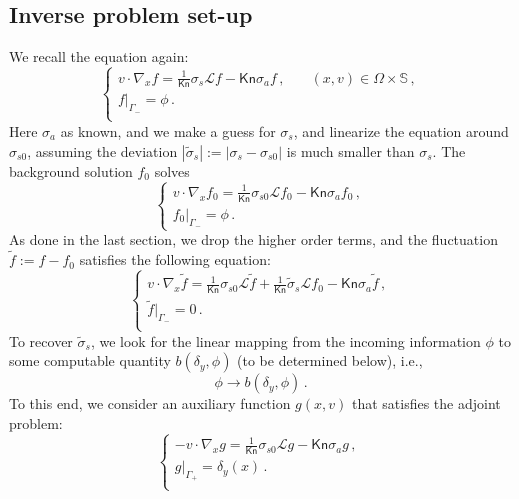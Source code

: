 \documentclass[english,reqno]{amsart}
\theoremstyle{plain}
\theoremstyle{definition} %
\newcommand{\opL}{\mathcal{L}}
\newcommand{\Kn}{\mathsf{Kn}}
\begin{document}
\subsection{Inverse problem set-up}\label{sec:sigma_s_set_up}
We recall the equation again:
\begin{equation}\label{eqn:RTE_sca}
\begin{cases}
v\cdot \nabla_x f =  \frac{1}{\Kn}\sigma_s \mathcal{L} f - \Kn \sigma_a f \,,\quad &(x,v)\in\Omega\times\mathbb{S}\,,\\
 f |_{\Gamma_-}=\phi\,. &  \\
\end{cases}
\end{equation}
Here $\sigma_a$ as known, and we make a guess for $\sigma_s$, and linearize the equation around $\sigma_{s0}$, assuming the deviation $|\tilde{\sigma}_s|:=|\sigma_s-\sigma_{s0}|$ is much smaller than $\sigma_s$. The background solution $f_0$ solves
\begin{equation}\label{eqn:RTE_sca_0}
\begin{cases}
v \cdot \nabla_x f_0 = \frac{1}{\Kn} \sigma_{s0} \opL f_0 -\Kn \sigma_a f_0 \,,
\\ f_0 |_{\Gamma_-} = \phi\,.
\end{cases}
\end{equation}
As done in the last section, we drop the higher order terms, and the fluctuation $\tilde{f}:=f-f_0$ satisfies the following equation:
\begin{equation}\label{eqn:RTE_sca_tilde}
\begin{cases}
v\cdot\nabla_x \tilde{f} = \frac{1}{\Kn}\sigma_{s0} \mathcal{L} \tilde{f}+ \frac{1}{\Kn}\tilde{\sigma}_s\mathcal{L}f_0 - \Kn \sigma_a \tilde{f}\,,\\
\tilde{f}|_{\Gamma_-}=0\,. \\
\end{cases}
\end{equation}
To recover $\tilde{\sigma}_s$, we look for the linear mapping from the incoming information $\phi$ to some computable quantity $b(\delta_y, \phi)$ (to be determined below), i.e.,
\[
 \phi \rightarrow b(\delta_y, \phi)\,.
\]
To this end, we consider an auxiliary function $g(x,v)$ that satisfies the adjoint problem:
\begin{equation}\label{eqn:RTE_sca_g}
\begin{cases}
-v\cdot\nabla_x g= \frac{1}{\Kn}\sigma_{s0} \mathcal{L}g - \Kn \sigma_a g \,, \\
g|_{\Gamma_+}=\delta_{y}(x) \,. \\
\end{cases}\,
\end{equation}
\end{document}
